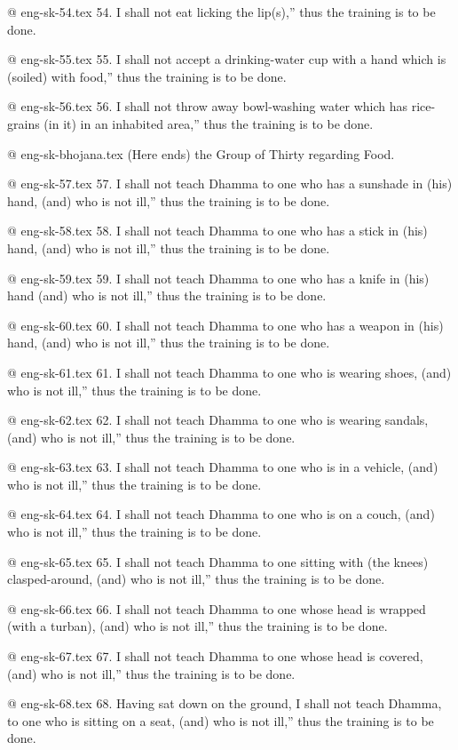 @  eng-sk-54.tex
54. I shall not eat licking the lip(s),” thus the training is to be done.

@  eng-sk-55.tex
55. I shall not accept a drinking-water cup with a hand which is (soiled) with food,” thus the training is to be done.

@  eng-sk-56.tex
56. I shall not throw away bowl-washing water which has rice-grains (in it) in an inhabited area,” thus the training is to be done.

@ eng-sk-bhojana.tex
(Here ends) the Group of Thirty regarding Food.

@ eng-sk-57.tex
57. I shall not teach Dhamma to one who has a sunshade in (his) hand, (and) who is not ill,” thus the training is to be done.

@  eng-sk-58.tex
58. I shall not teach Dhamma to one who has a stick in (his) hand, (and) who is not ill,” thus the training is to be done.

@  eng-sk-59.tex
59. I shall not teach Dhamma to one who has a knife in (his) hand (and) who is not ill,” thus the training is to be done.

@  eng-sk-60.tex
60. I shall not teach Dhamma to one who has a weapon in (his) hand, (and) who is not ill,” thus the training is to be done.

@  eng-sk-61.tex
61. I shall not teach Dhamma to one who is wearing shoes, (and) who is not ill,” thus the training is to be done.

@  eng-sk-62.tex
62. I shall not teach Dhamma to one who is wearing sandals, (and) who is not ill,” thus the training is to be done.

@  eng-sk-63.tex
63. I shall not teach Dhamma to one who is in a vehicle, (and) who is not ill,” thus the training is to be done.

@  eng-sk-64.tex
64. I shall not teach Dhamma to one who is on a couch, (and) who is not ill,” thus the training is to be done.

@  eng-sk-65.tex
65. I shall not teach Dhamma to one sitting with (the knees) clasped-around, (and) who is not ill,” thus the training is to be done.

@  eng-sk-66.tex
66. I shall not teach Dhamma to one whose head is wrapped (with a turban), (and) who is not ill,” thus the
training is to be done.

@  eng-sk-67.tex
67. I shall not teach Dhamma to one whose head is covered, (and) who is not ill,” thus the training is to be done.

@  eng-sk-68.tex
68. Having sat down on the ground, I shall not teach Dhamma, to one who is sitting on a seat, (and) who is not ill,” thus the training is to be done.

